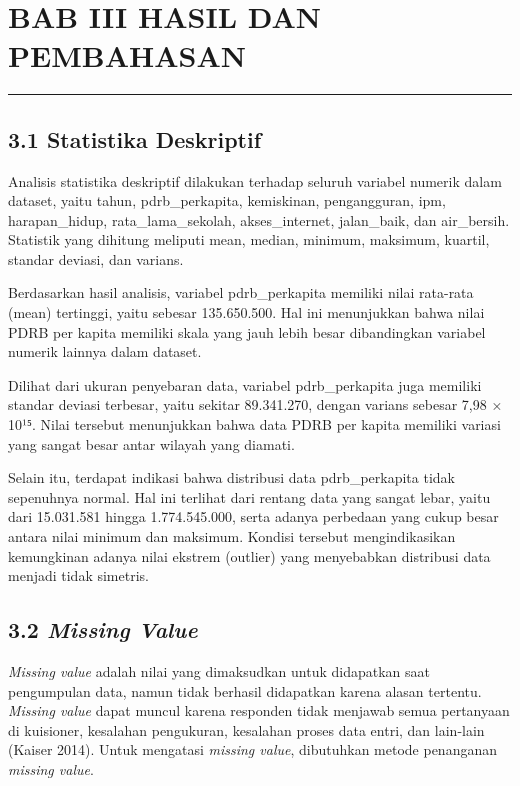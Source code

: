 \documentclass[
]{article}
\begin{document}
\section{BAB III HASIL DAN
PEMBAHASAN}\label{bab-iii-hasil-dan-pembahasan}

\begin{center}\rule{0.5\linewidth}{0.5pt}\end{center}

\subsection{3.1 Statistika Deskriptif}\label{statistika-deskriptif}

Analisis statistika deskriptif dilakukan terhadap seluruh variabel
numerik dalam dataset, yaitu tahun, pdrb\_perkapita, kemiskinan,
pengangguran, ipm, harapan\_hidup, rata\_lama\_sekolah, akses\_internet,
jalan\_baik, dan air\_bersih. Statistik yang dihitung meliputi mean,
median, minimum, maksimum, kuartil, standar deviasi, dan varians.

Berdasarkan hasil analisis, variabel pdrb\_perkapita memiliki nilai
rata-rata (mean) tertinggi, yaitu sebesar 135.650.500. Hal ini
menunjukkan bahwa nilai PDRB per kapita memiliki skala yang jauh lebih
besar dibandingkan variabel numerik lainnya dalam dataset.

Dilihat dari ukuran penyebaran data, variabel pdrb\_perkapita juga
memiliki standar deviasi terbesar, yaitu sekitar 89.341.270, dengan
varians sebesar 7,98 × 10¹⁵. Nilai tersebut menunjukkan bahwa data PDRB
per kapita memiliki variasi yang sangat besar antar wilayah yang
diamati.

Selain itu, terdapat indikasi bahwa distribusi data pdrb\_perkapita
tidak sepenuhnya normal. Hal ini terlihat dari rentang data yang sangat
lebar, yaitu dari 15.031.581 hingga 1.774.545.000, serta adanya
perbedaan yang cukup besar antara nilai minimum dan maksimum. Kondisi
tersebut mengindikasikan kemungkinan adanya nilai ekstrem (outlier) yang
menyebabkan distribusi data menjadi tidak simetris.

\subsection{\texorpdfstring{3.2 \emph{Missing
Value}}{3.2 Missing Value}}\label{missing-value}

\emph{Missing value} adalah nilai yang dimaksudkan untuk didapatkan saat
pengumpulan data, namun tidak berhasil didapatkan karena alasan
tertentu. \emph{Missing value} dapat muncul karena responden tidak
menjawab semua pertanyaan di kuisioner, kesalahan pengukuran, kesalahan
proses data entri, dan lain-lain (Kaiser 2014). Untuk mengatasi
\emph{missing value}, dibutuhkan metode penanganan \emph{missing value}.
\end{document}
